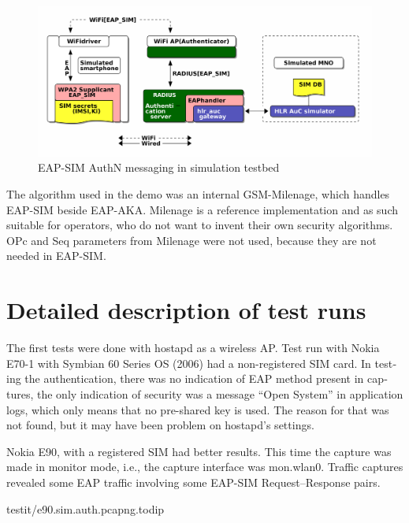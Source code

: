 \documentclass[12pt,a4paper,english]{tutthesis}
\begin{document}
\begin{otherlanguage}{english}
\begin{figure}[htb]
\centering
\includegraphics[width=.9\linewidth]{demoinfra.png}
\caption{\label{eap-sim-testbed}EAP-SIM AuthN messaging in simulation testbed}
\end{figure}





The algorithm used in the demo was an internal GSM-Milenage,
which handles EAP-SIM beside EAP-AKA.
Milenage is a reference implementation and as such suitable for operators, who do not 
want to invent their own security algorithms. OPc and Seq parameters from
Milenage were not used, because they are not needed in EAP-SIM. 

\section{Detailed description of test runs}
\label{sec-5-2}


The first tests were done with hostapd as a wireless AP.
Test run with Nokia E70-1 with Symbian 60 Series OS (2006) had a
non-registered SIM card. 
In testing the authentication,
there was no indication of EAP method present in captures, the only
indication of security was a message ``Open System'' in application
logs, which only means that no pre-shared key is used. The reason for
that was not found, but it may have been problem on hostapd's settings.




Nokia E90, with a registered SIM had better results. 
This time the capture was made in monitor mode, i.e., 
the capture interface was mon.wlan0.
Traffic captures revealed some EAP traffic involving some EAP-SIM
Request--Response pairs.




\renewcommand{\lstlistingname}{Capture}

  {testit/e90.sim.auth.pcapng.todip}


\end{otherlanguage}
\end{document}
